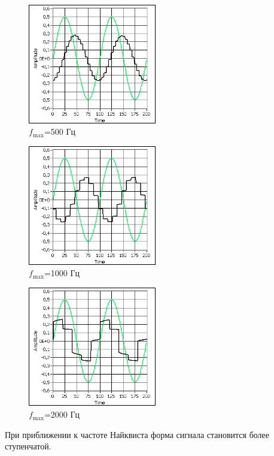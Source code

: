 \documentclass[a4paper,14pt]{extarticle}
\begin{document}
\begin{figure}[H]
  \centering
  \includegraphics[width=0.5\textwidth]{Z4_FN4/signal_500.png}
  \caption{$f_{\max}$=500 Гц}
  \label{fig:}
\end{figure}
\begin{figure}[H]
  \centering
  \includegraphics[width=0.5\textwidth]{Z4_FN4/signal_1000.png}
  \caption{$f_{\max}$=1000 Гц}
  \label{fig:}
\end{figure}
\begin{figure}[H]
  \centering
  \includegraphics[width=0.5\textwidth]{Z4_FN4/signal_2000.png}
  \caption{$f_{\max}$=2000 Гц}
  \label{fig:}
\end{figure}

При приближении к частоте Найквиста форма сигнала становится более ступенчатой.
\end{document}
